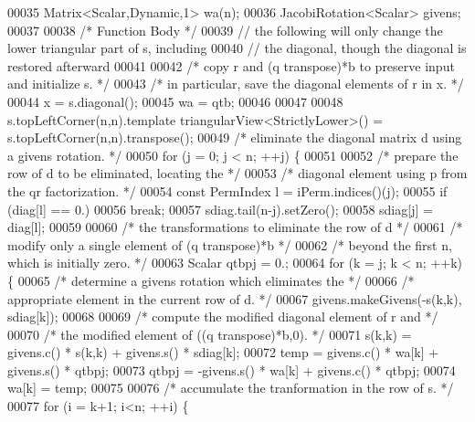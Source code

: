 \begin{DoxyCode}
00035     Matrix<Scalar,Dynamic,1>  wa(n);
00036     JacobiRotation<Scalar> givens;
00037 
00038     \textcolor{comment}{/* Function Body */}
00039     \textcolor{comment}{// the following will only change the lower triangular part of s, including}
00040     \textcolor{comment}{// the diagonal, though the diagonal is restored afterward}
00041 
00042     \textcolor{comment}{/*     copy r and (q transpose)*b to preserve input and initialize s. */}
00043     \textcolor{comment}{/*     in particular, save the diagonal elements of r in x. */}
00044     x = s.diagonal();
00045     wa = qtb;
00046     
00047    
00048     s.topLeftCorner(n,n).template triangularView<StrictlyLower>() = s.topLeftCorner(n,n).transpose();
00049     \textcolor{comment}{/*     eliminate the diagonal matrix d using a givens rotation. */}
00050     \textcolor{keywordflow}{for} (j = 0; j < n; ++j) \{
00051 
00052         \textcolor{comment}{/*        prepare the row of d to be eliminated, locating the */}
00053         \textcolor{comment}{/*        diagonal element using p from the qr factorization. */}
00054         \textcolor{keyword}{const} PermIndex l = iPerm.indices()(j);
00055         \textcolor{keywordflow}{if} (diag[l] == 0.)
00056             \textcolor{keywordflow}{break};
00057         sdiag.tail(n-j).setZero();
00058         sdiag[j] = diag[l];
00059 
00060         \textcolor{comment}{/*        the transformations to eliminate the row of d */}
00061         \textcolor{comment}{/*        modify only a single element of (q transpose)*b */}
00062         \textcolor{comment}{/*        beyond the first n, which is initially zero. */}
00063         Scalar qtbpj = 0.;
00064         \textcolor{keywordflow}{for} (k = j; k < n; ++k) \{
00065             \textcolor{comment}{/*           determine a givens rotation which eliminates the */}
00066             \textcolor{comment}{/*           appropriate element in the current row of d. */}
00067             givens.makeGivens(-s(k,k), sdiag[k]);
00068 
00069             \textcolor{comment}{/*           compute the modified diagonal element of r and */}
00070             \textcolor{comment}{/*           the modified element of ((q transpose)*b,0). */}
00071             s(k,k) = givens.c() * s(k,k) + givens.s() * sdiag[k];
00072             temp = givens.c() * wa[k] + givens.s() * qtbpj;
00073             qtbpj = -givens.s() * wa[k] + givens.c() * qtbpj;
00074             wa[k] = temp;
00075 
00076             \textcolor{comment}{/*           accumulate the tranformation in the row of s. */}
00077             \textcolor{keywordflow}{for} (i = k+1; i<n; ++i) \{

\end{DoxyCode}

